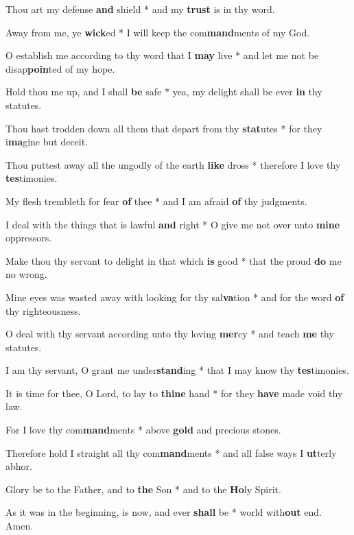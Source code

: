 \begin{multicols}{2}
	Thou art my defense \textbf{and} shield * and my \textbf{trust} is in thy word.
	
	Away from me, ye \textbf{wick}ed * I will keep the com\textbf{mand}ments of my God.
	
	O establish me according to thy word that I \textbf{may} live * and let me not be disap\textbf{poin}ted of my hope.
	
	Hold thou me up, and I shall \textbf{be} safe * yea, my delight shall be ever \textbf{in} thy statutes.
	
	Thou hast trodden down all them that depart from thy \textbf{stat}utes * for they i\textbf{ma}gine but deceit.
	
	Thou puttest away all the ungodly of the earth \textbf{like} dross * therefore I love thy \textbf{tes}timonies.
	
	My flesh trembleth for fear \textbf{of} thee * and I am afraid \textbf{of} thy judgments.
	
	I deal with the things that is lawful \textbf{and} right * O give me not over unto \textbf{mine} oppressors.
	
	Make thou thy servant to delight in that which \textbf{is} good * that the proud \textbf{do} me no wrong.
	
	Mine eyes was wasted away with looking for thy sal\textbf{va}tion * and for the word \textbf{of} thy righteousness.
	
	O deal with thy servant according unto thy loving \textbf{mer}cy * and teach \textbf{me} thy statutes.
	
	I am thy servant, O grant me under\textbf{stand}ing * that I may know thy \textbf{tes}timonies.
	
	It is time for thee, O Lord, to lay to \textbf{thine} hand * for they \textbf{have} made void thy law.
	
	For I love thy com\textbf{mand}ments * above \textbf{gold} and precious stones.
	
	Therefore hold I straight all thy com\textbf{mand}ments * and all false ways I \textbf{ut}terly abhor. 
	
	Glory be to the Father, and to \textbf{the} Son * and to the \textbf{Ho}ly Spirit.
	
	As it was in the beginning, is now, and ever \textbf{shall} be * world with\textbf{out} end. Amen.
\end{multicols}